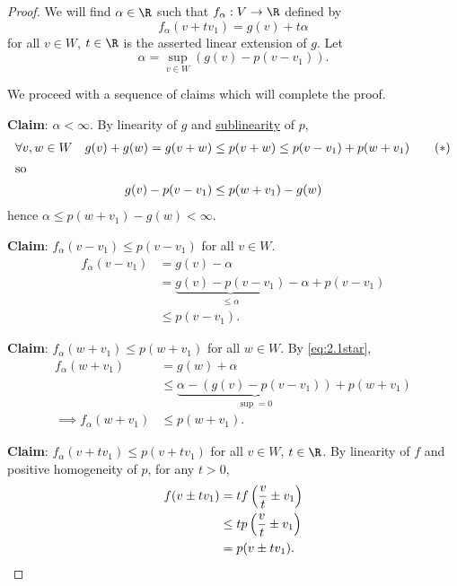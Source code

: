 \documentclass{article}
\begin{document}
\begin{proof}
    We will find $\alpha \in \R$ such that $f_\alpha: V \to \R$ defined by
    \begin{equation*}
        f_\alpha(v + tv_1) = g(v) + t\alpha
    \end{equation*}
    for all $v \in W$, $t \in \R$ is the asserted linear extension of $g$. Let
    \begin{equation*}
        \alpha = \sup_{v \in W} (g(v) - p(v - v_1)).
    \end{equation*}

    We proceed with a sequence of claims which will complete the proof.

    \textbf{Claim}: $\alpha < \infty$.
    By linearity of $g$ and \hyperlink{def:sublinear}{sublinearity} of $p$,
    \begin{align*}
        \forall v,w \in W \quad g(v) + g(w) = g(v + w) &\leq p(v + w) \leq p(v - v_1) + p(w + v_1) \tag{$*$} \label{eq:2.1star} \\
        \shortintertext{so}
        g(v) - p(v-v_1) &\leq p(w + v_1) - g(w)
    \end{align*}
    hence $\alpha \leq p(w + v_1) - g(w) < \infty$.

    \textbf{Claim}: $f_\alpha(v - v_1) \leq p(v - v_1)$ for all $v \in W$.
    \begin{align*}
        f_\alpha(v - v_1) &= g(v) - \alpha \\
                          &= \underbrace{g(v) - p(v - v_1)}_{\leq \alpha} - \alpha + p(v - v_1) \\
                          &\leq p(v - v_1).
    \end{align*}

    \textbf{Claim}: $f_\alpha(w + v_1) \leq p(w + v_1)$ for all $w \in W$.
    By \eqref{eq:2.1star},
    \begin{align*}
        f_\alpha(w + v_1) &= g(w) + \alpha \\
                          &\leq \underbrace{\alpha - (g(v) - p(v-v_1))}_{\sup = 0} + p(w + v_1) \\
        \implies f_\alpha(w + v_1) &\leq p(w + v_1).
    \end{align*}

    \textbf{Claim}: $f_\alpha(v + t v_1) \leq p(v + t v_1)$ for all $v \in W$, $t \in \R$.
    By linearity of $f$ and positive homogeneity of $p$, for any $t > 0$,
    \begin{align*}
        f(v \pm t v_1) &= t f\left(\frac vt \pm v_1\right) \\
                       &\leq t p\left(\frac vt \pm v_1\right) \\
                       &= p(v \pm t v_1).\qedhere
    \end{align*}
\end{proof}
\end{document}
